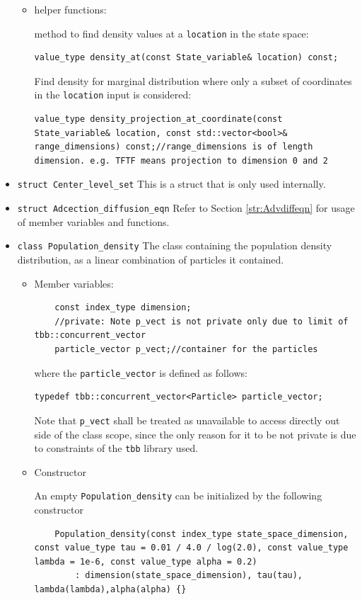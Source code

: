 \documentclass[10pt]{article} %
\begin{document}
\begin{itemize}
\begin{itemize}
\item
helper functions:

method to find density values at a \texttt{location} in the state space: 
\begin{lstlisting}
value_type density_at(const State_variable& location) const;
\end{lstlisting}
Find density for marginal distribution where only a subset of coordinates in the \texttt{location} input is considered:
\begin{lstlisting}
value_type density_projection_at_coordinate(const State_variable& location, const std::vector<bool>& range_dimensions) const;//range_dimensions is of length dimension. e.g. TFTF means projection to dimension 0 and 2
\end{lstlisting}
\end{itemize}
\item
\texttt{struct Center\_level\_set}
This is a struct that is only used internally.
\item
\texttt{struct Adcection\_diffusion\_eqn} Refer to Section \ref{str:Advdiffeqn} for usage of member variables and functions. 
\item
\texttt{class Population\_density} The class containing the population density distribution, as a linear combination of particles it contained. 
\begin{itemize}
\item
Member variables:
\begin{lstlisting}
	const index_type dimension;
	//private: Note p_vect is not private only due to limit of tbb::concurrent_vector
	particle_vector p_vect;//container for the particles
\end{lstlisting}
where the \texttt{particle\_vector} is defined as follows:
\begin{lstlisting}
typedef tbb::concurrent_vector<Particle> particle_vector;
\end{lstlisting}
Note that \texttt{p\_vect} shall be treated as unavailable to access directly out side of the class scope, since the only reason for it to be not private is due to constraints of the \texttt{tbb} library used. 
\item
Constructor

An empty \texttt{Population\_density} can be initialized by the following constructor
\begin{lstlisting}
	Population_density(const index_type state_space_dimension, const value_type tau = 0.01 / 4.0 / log(2.0), const value_type lambda = 1e-6, const value_type alpha = 0.2)
		: dimension(state_space_dimension), tau(tau), lambda(lambda),alpha(alpha) {}
\end{lstlisting}


\end{itemize}
\end{itemize}
\end{document}
